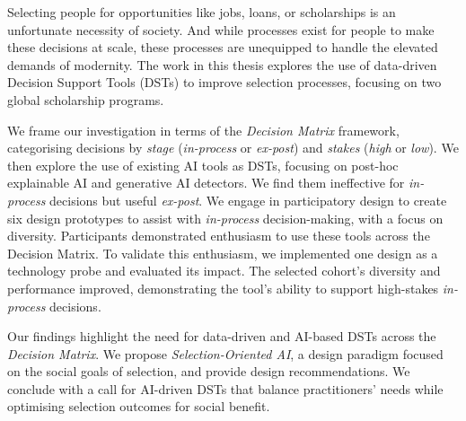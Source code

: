 Selecting people for opportunities like jobs, loans, or scholarships is an unfortunate necessity of society. And while processes exist for people to make these decisions at scale, these processes are unequipped to handle the elevated demands of modernity. The work in this thesis explores the use of data-driven Decision Support Tools (DSTs) to improve selection processes, focusing on two global scholarship programs.

We frame our investigation in terms of the \emph{Decision Matrix} framework, categorising decisions by \emph{stage} (\emph{in-process} or \emph{ex-post}) and \emph{stakes} (\emph{high} or \emph{low}). We then explore the use of existing AI tools as DSTs, focusing on post-hoc explainable AI and generative AI detectors. We find them ineffective for \emph{in-process} decisions but useful \emph{ex-post}. We engage in participatory design to create six design prototypes to assist with \emph{in-process} decision-making, with a focus on diversity. Participants demonstrated enthusiasm to use these tools across the Decision Matrix. To validate this enthusiasm, we implemented one design as a technology probe and evaluated its impact. The selected cohort's diversity and performance improved, demonstrating the tool's ability to support high-stakes \emph{in-process} decisions. 

Our findings highlight the need for data-driven and AI-based DSTs across the \emph{Decision Matrix}. We propose \emph{Selection-Oriented AI}, a design paradigm focused on the social goals of selection, and provide design recommendations. We conclude with a call for AI-driven DSTs that balance practitioners' needs while optimising selection outcomes for social benefit.